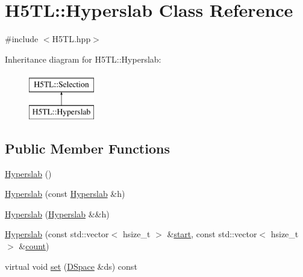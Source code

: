 \hypertarget{class_h5_t_l_1_1_hyperslab}{\section{H5\-T\-L\-:\-:Hyperslab Class Reference}
\label{class_h5_t_l_1_1_hyperslab}
}


{\ttfamily \#include $<$H5\-T\-L.\-hpp$>$}

Inheritance diagram for H5\-T\-L\-:\-:Hyperslab\-:\begin{figure}[H]
\begin{center}
\leavevmode
\includegraphics[height=2.000000cm]{class_h5_t_l_1_1_hyperslab}
\end{center}
\end{figure}
\subsection*{Public Member Functions}
\begin{DoxyCompactItemize}
\item 
\hyperlink{class_h5_t_l_1_1_hyperslab_a5dcf0570bbda6a425edaaf2af29f3fb1}{Hyperslab} ()
\item 
\hyperlink{class_h5_t_l_1_1_hyperslab_a6767e21930b6bf0045ff24344b062c25}{Hyperslab} (const \hyperlink{class_h5_t_l_1_1_hyperslab}{Hyperslab} \&h)
\item 
\hyperlink{class_h5_t_l_1_1_hyperslab_af558c4b94ecde78058d2c47520d1e8b0}{Hyperslab} (\hyperlink{class_h5_t_l_1_1_hyperslab}{Hyperslab} \&\&h)
\item 
\hyperlink{class_h5_t_l_1_1_hyperslab_a84b19741f0b131c62fdf82a596ae3a29}{Hyperslab} (const std\-::vector$<$ hsize\-\_\-t $>$ \&\hyperlink{class_h5_t_l_1_1_hyperslab_ae3087ea27a6ab424547472e6c4a6c531}{start}, const std\-::vector$<$ hsize\-\_\-t $>$ \&\hyperlink{class_h5_t_l_1_1_hyperslab_ae3e0aa330ed576da3267eeb02e4ca4c0}{count})
\item 
virtual void \hyperlink{class_h5_t_l_1_1_hyperslab_a70290a488decd4290d13257aae5e6a4b}{set} (\hyperlink{class_h5_t_l_1_1_d_space}{D\-Space} \&ds) const 
\end{DoxyCompactItemize}
